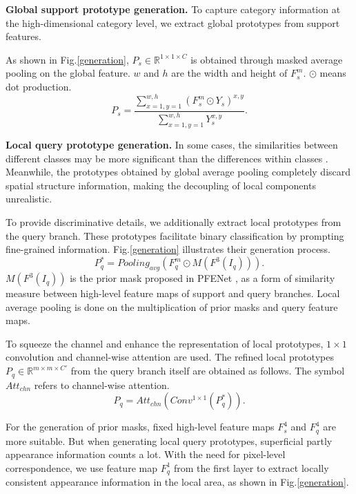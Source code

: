 \documentclass[letterpaper]{article} %
\begin{document}
\textbf{Global support prototype generation.}
To capture category information at the high-dimensional category level, we extract global prototypes from support features.

As shown in Fig.\ref{generation}, $P_{s} \in \mathbb{R}^{1\times 1\times C}$ is obtained through masked average pooling on the global feature. $w$ and $h$ are the width and height of $F^{m}_s$. $\odot$ means dot production.
\begin{equation}
            P_{s} = \frac{\sum^{w,h}_{x=1,y=1}(F^{m}_s \odot Y_s)^{x,y}}{\sum^{w,h}_{x=1,y=1}Y_{s}^{x,y}}.
\end{equation}%

\textbf{Local query prototype generation.}
In some cases, the similarities between different classes may be more significant than the differences within classes \cite{fan2022self}. Meanwhile, the prototypes obtained by global average pooling completely discard spatial structure information, making the decoupling of local components unrealistic.

To provide discriminative details, we additionally extract local prototypes from the query branch. These prototypes facilitate binary classification by prompting fine-grained information. Fig.\ref{generation} illustrates their generation process.
\begin{equation}
            P^*_{q} = Pooling_{avg}(F^{m}_q \odot M(F^3(I_q))).
\end{equation}%
$M(F^3(I_q))$ is the prior mask proposed in PFENet \cite{tian2020prior}, as a form of similarity measure between high-level feature maps of support and query branches. Local average pooling is done on the multiplication of prior masks and query feature maps.

To squeeze the channel and enhance the representation of local prototypes, $1\times1$ convolution and channel-wise attention are used. The refined local prototypes $P_{q} \in \mathbb{R}^{m\times m\times C'}$ from the query branch itself are obtained as follows. The symbol $Att_{chn}$ refers to channel-wise attention.
\begin{equation}
            P_{q} = Att_{chn}(Conv^{1\times 1}(P^*_{q})).
\end{equation}%

For the generation of prior masks, fixed high-level feature maps $F^{4}_{s}$ and $F^{4}_{q}$ are more suitable. But when generating local query prototypes, superficial partly appearance information counts a lot. With the need for pixel-level correspondence, we use feature map $F^{1}_{q}$ from the first layer to extract locally consistent appearance information in the local area, as shown in Fig.\ref{generation}.
\end{document}
